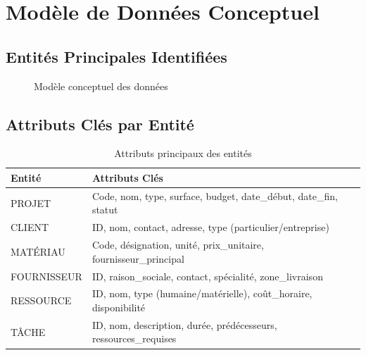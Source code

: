 \documentclass[12pt, a4paper]{report}
\begin{document}
\section{Modèle de Données Conceptuel}

\subsection{Entités Principales Identifiées}

\begin{figure}[h]
\centering
{}
\caption{Modèle conceptuel des données}
\end{figure}

\subsection{Attributs Clés par Entité}

\begin{table}[h]
\centering
\caption{Attributs principaux des entités}
\begin{tabular}{|l|p{8cm}|}
\hline
\textbf{Entité} & \textbf{Attributs Clés} \\
\hline
PROJET & Code, nom, type, surface, budget, date_début, date_fin, statut \\
\hline
CLIENT & ID, nom, contact, adresse, type (particulier/entreprise) \\
\hline
MATÉRIAU & Code, désignation, unité, prix_unitaire, fournisseur_principal \\
\hline
FOURNISSEUR & ID, raison_sociale, contact, spécialité, zone_livraison \\
\hline
RESSOURCE & ID, nom, type (humaine/matérielle), coût_horaire, disponibilité \\
\hline
TÂCHE & ID, nom, description, durée, prédécesseurs, ressources_requises \\
\hline
\end{tabular}
\end{table}
\end{document}

